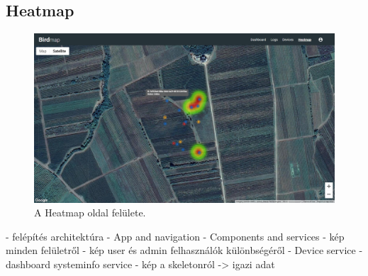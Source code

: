 \subsection{Heatmap}
\begin{figure}[!ht]
    \centering
    \includegraphics[width=150mm, keepaspectratio]{figures/heatmap.png}
    \caption{A Heatmap oldal felülete.}
    \label{fig:frontend-heatmap}
\end{figure}








- felépítés architektúra
- App and navigation
- Components and services
- kép minden felületről
    - kép user és admin felhasználók különbségéről
        - Device service
        - dashboard systeminfo service
    - kép a skeletonról -> igazi adat